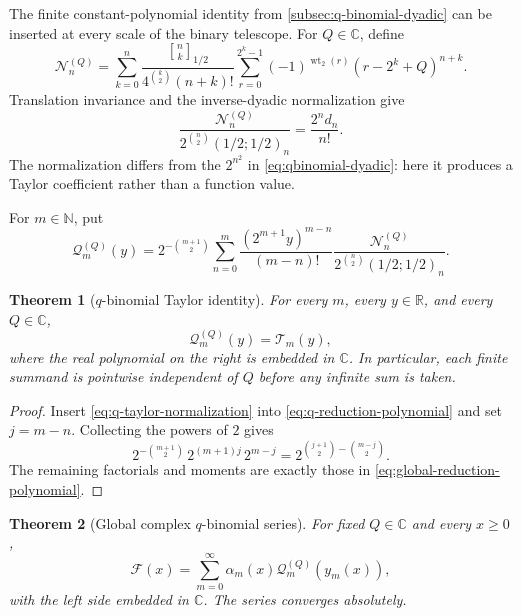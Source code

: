 \documentclass[11pt,oneside]{article}
\newtheorem{theorem}{Theorem}[section]
\theoremstyle{definition}
\theoremstyle{remark}
\newcommand{\R}{\mathbb R}
\newcommand{\C}{\mathbb C}
\newcommand{\N}{\mathbb N}
\newcommand{\wt}{\operatorname{wt}_2}
\newcommand{\qbinom}[3]{\genfrac{[}{]}{0pt}{}{#1}{#2}_{#3}}
\begin{document}
The finite constant-polynomial identity from \cref{subsec:q-binomial-dyadic} can be inserted
at every scale of the binary telescope.  For $Q\in\C$, define
\begin{equation}
 \mathcal N_n^{(Q)}=
 \sum_{k=0}^{n}
 \frac{\qbinom nk{1/2}}{4^{\binom k2}(n+k)!}
 \sum_{r=0}^{2^k-1}(-1)^{\wt(r)}
 (r-2^k+Q)^{n+k}.                                       \label{eq:q-global-numerator}
\end{equation}
Translation invariance and the inverse-dyadic normalization give
\begin{equation}
 \frac{\mathcal N_n^{(Q)}}
 {2^{\binom n2}(1/2;1/2)_n}
 =\frac{2^n d_n}{n!}.                                    \label{eq:q-taylor-normalization}
\end{equation}
The normalization differs from the $2^{n^2}$ in
\eqref{eq:qbinomial-dyadic}: here it produces a Taylor coefficient rather than a function
value.

For $m\in\N$, put
\begin{equation}
 \mathcal Q_m^{(Q)}(y)=
 2^{-\binom{m+1}{2}}
 \sum_{n=0}^{m}
 \frac{(2^{m+1}y)^{m-n}}{(m-n)!}
 \frac{\mathcal N_n^{(Q)}}
 {2^{\binom n2}(1/2;1/2)_n}.                             \label{eq:q-reduction-polynomial}
\end{equation}

\begin{theorem}[$q$-binomial Taylor identity]
For every $m$, every $y\in\R$, and every $Q\in\C$,
\begin{equation}
 \mathcal Q_m^{(Q)}(y)=\mathcal T_m(y),                  \label{eq:q-reduction-equals-taylor}
\end{equation}
where the real polynomial on the right is embedded in $\C$.  In particular, each finite
summand is pointwise independent of $Q$ before any infinite sum is taken.
\end{theorem}

\begin{proof}
Insert \eqref{eq:q-taylor-normalization} into
\eqref{eq:q-reduction-polynomial} and set $j=m-n$.  Collecting the powers of $2$ gives
\begin{equation*}
 2^{-\binom{m+1}{2}}\,2^{(m+1)j}\,2^{m-j}
 =2^{\binom{j+1}{2}-\binom{m-j}{2}}.
\end{equation*}
The remaining factorials and moments are exactly those in
\eqref{eq:global-reduction-polynomial}.
\end{proof}

\begin{theorem}[Global complex $q$-binomial series]
For fixed $Q\in\C$ and every $x\ge0$,
\begin{equation}
 \boxed{
 \mathcal F(x)=\sum_{m=0}^{\infty}
 \alpha_m(x)\mathcal Q_m^{(Q)}(y_m(x)),}                 \label{eq:global-q-binomial-series}
\end{equation}
with the left side embedded in $\C$.  The series converges absolutely.
\end{theorem}
\end{document}
